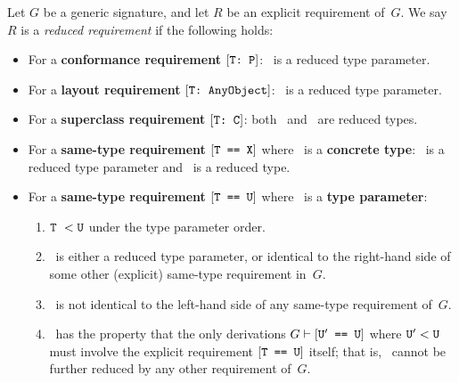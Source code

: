 \documentclass[../generics]{subfiles}
\begin{document}
\begin{definition}\label{reduced requirement}
Let $G$ be a generic signature, and let $R$ be an explicit requirement of~$G$. We say $R$ is a \emph{reduced requirement} if the following holds:
\begin{itemize}
\item For a \textbf{conformance requirement} $[\texttt{T:~P}]$: \tT\ is a reduced type parameter.
\item For a \textbf{layout requirement} $[\texttt{T:~AnyObject}]$: \tT\ is a reduced type parameter.
\item For a \textbf{superclass requirement} $[\texttt{T:~C}]$: both \tT\ and \tC\ are reduced types.
\item For a \textbf{same-type requirement} $[\texttt{T == X}]$ where \tX\ is a \textbf{concrete type}: \tT\ is a reduced type parameter and \tX\ is a reduced type.
\item For a \textbf{same-type requirement} $[\texttt{T == U}]$ where \tU\ is a \textbf{type parameter}:
\begin{enumerate}
\item $\texttt{T}\ < \texttt{U}$ under the type parameter order.
\item \tT\ is either a reduced type parameter, or identical to the right-hand side of some other (explicit) same-type requirement in~$G$.
\item \tT\ is not identical to the left-hand side of any same-type requirement of~$G$.
\item \tU\ has the property that the only derivations $G\vdash[\texttt{$\texttt{U}^\prime$ == U}]$ where $\texttt{U}^\prime<\texttt{U}$ must involve the explicit requirement $[\texttt{T == U}]$ itself; that is, \tU\ cannot be further reduced by any other requirement of~$G$.
\end{enumerate}
\end{itemize}
\end{definition}
\end{document}
